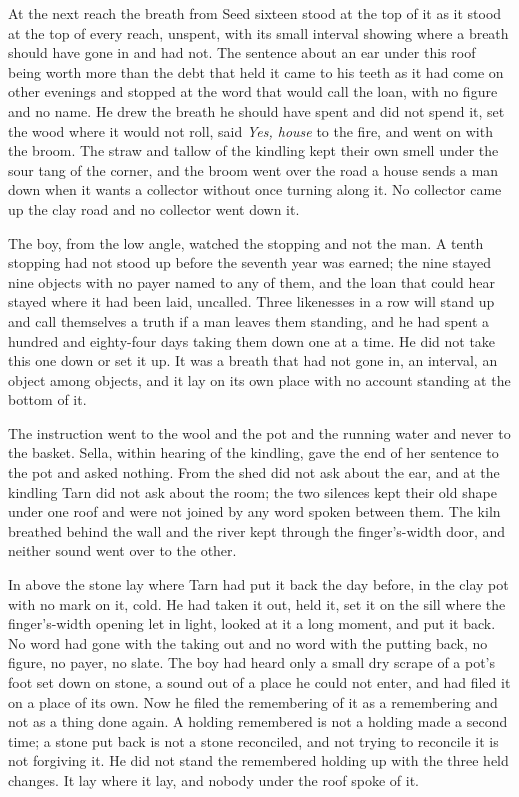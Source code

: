 At the next reach the breath from Seed sixteen stood at the top of it as it stood at the top of every reach, unspent, with its small interval showing where a breath should have gone in and had not. The sentence about an ear under this roof being worth more than the debt that held it came to his teeth as it had come on other evenings and stopped at the word that would call the loan, with no figure and no name. He drew the breath he should have spent and did not spend it, set the wood where it would not roll, said \emph{Yes, house} to the fire, and went on with the broom. The straw and tallow of the kindling kept their own smell under the sour tang of the corner, and the broom went over the road a house sends a man down when it wants a collector without once turning along it. No collector came up the clay road and no collector went down it.

The boy, from the low angle, watched the stopping and not the man. A tenth stopping had not stood up before the seventh year was earned; the nine stayed nine objects with no payer named to any of them, and the loan that could hear stayed where it had been laid, uncalled. Three likenesses in a row will stand up and call themselves a truth if a man leaves them standing, and he had spent a hundred and eighty-four days taking them down one at a time. He did not take this one down or set it up. It was a breath that had not gone in, an interval, an object among objects, and it lay on its own place with no account standing at the bottom of it.

\scenebreak

The instruction went to the wool and the pot and the running water and never to the basket. Sella, within hearing of the kindling, gave the end of her sentence to the pot and asked nothing. From the shed  did not ask about the ear, and at the kindling Tarn did not ask about the room; the two silences kept their old shape under one roof and were not joined by any word spoken between them. The kiln breathed behind the wall and the river kept  through the finger's-width door, and neither sound went over to the other.

In  above  the stone lay where Tarn had put it back the day before, in the clay pot with no mark on it, cold. He had taken it out, held it, set it on the sill where the finger's-width opening let in light, looked at it a long moment, and put it back. No word had gone with the taking out and no word with the putting back, no figure, no payer, no slate. The boy had heard only a small dry scrape of a pot's foot set down on stone, a sound out of a place he could not enter, and had filed it on a place of its own. Now he filed the remembering of it as a remembering and not as a thing done again. A holding remembered is not a holding made a second time; a stone put back is not a stone reconciled, and not trying to reconcile it is not forgiving it. He did not stand the remembered holding up with the three held changes. It lay where it lay, and nobody under the roof spoke of it.

